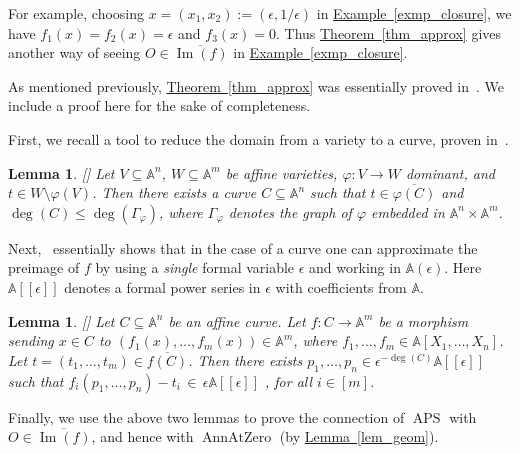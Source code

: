 \documentclass[11pt]{article}
\numberwithin{equation}{section}
\newtheorem{lemma}[theorem]{Lemma}
\theoremstyle{definition}
\theoremstyle{plain}
\newcommand{\expref}[2]{\hyperref[#2]{#1~\ref{#2}}}
\newcommand{\aff}{\mathbb{A}}
\DeclareMathOperator{\im}{\mathrm{Im}}
\newcommand{\ol}[1]{\overline{#1}}
\DeclareMathOperator{\APS}{\mathrm{APS}\xspace} %
\DeclareMathOperator{\AnnAtZero}{\mathrm{AnnAtZero}\xspace} %
\begin{document}
For example, choosing $x=(x_1,x_2):=(\epsilon, 1/\epsilon)$ in \expref{Example}{exmp_closure},  we have $f_1(x)=f_2(x)=\epsilon$ and $f_3(x)=0$. Thus \expref{Theorem}{thm_approx} gives another way of seeing  $O\in \ol{\im(f)}$ in \expref{Example}{exmp_closure}.

As mentioned previously, \expref{Theorem}{thm_approx} was  essentially proved  in~\cite{LL89}. We include a proof here for the sake of completeness.

First, we recall a tool to reduce the domain from a variety to a curve, proven in~\cite{LL89}.

\begin{lemma}
%
[{\cite[Proposition~1]{LL89}}] %
\label{lem_aux1}
Let $V\subseteq \aff^n$, $W\subseteq \aff^m$ be affine varieties, $\varphi: V\to W$ dominant, and $t\in W\setminus \varphi(V)$.
Then there exists a curve $C\subseteq \aff^n$ such that $t\in\overline{\varphi(C)}$ and $\deg(C)\leq \deg(\Gamma_\varphi)$, where $\Gamma_\varphi$ denotes the graph of $\varphi$ embedded in $\aff^n\times \aff^m$.
\end{lemma}

Next,~\cite{LL89} essentially shows that in the case of a curve one can approximate the preimage of $f$ by using a \emph{single} formal variable $\epsilon$ and working in $\aff(\epsilon)$. Here $\aff[[\epsilon]]$ denotes a formal power series in $\epsilon$ with coefficients from $\aff$.

\begin{lemma}
%
[{\cite[Corollary of Proposition~3]{LL89}}] %
\label{lem_aux2}
Let $C\subseteq \aff^n$ be an affine curve.  Let $f: C\to \aff^m$ be a morphism sending $x\in C$ to $(f_1(x),\dots,f_m(x))\in \aff^m$, where $f_1,\dots,f_m\in \aff[X_1,\dots,X_n]$. Let $t=(t_1,\dots,t_m)\in \overline{f(C)}$. Then there exists  $p_1,\dots,p_n\in \epsilon^{-\deg(C)}\aff[[\epsilon]]$ such that $f_i(p_1,\dots,p_n)-t_i \,\in\, \epsilon \aff[[\epsilon]]$ , for all $i\in [m]$.
\end{lemma}

Finally, we use the above two lemmas to prove the connection of $\APS$ with $O\in \overline{\im(f)}$, and hence with $\AnnAtZero$ (by \expref{Lemma}{lem_geom}).
\end{document}
